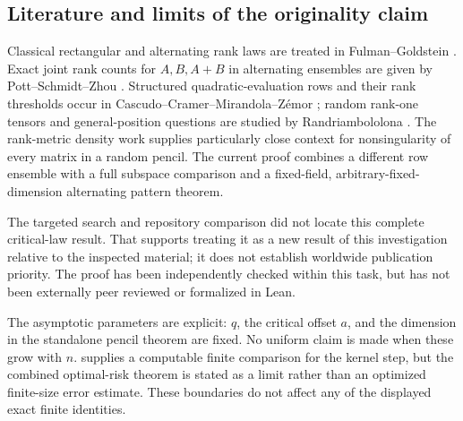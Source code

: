 \subsection{Literature and limits of the originality claim}

Classical rectangular and alternating rank laws are treated in
Fulman--Goldstein \cite{fulman}. Exact joint rank counts for
$A,B,A+B$ in alternating ensembles are given by Pott--Schmidt--Zhou
\cite{pott}. Structured quadratic-evaluation rows and their rank
thresholds occur in Cascudo--Cramer--Mirandola--Z\'emor \cite{cascudo};
random rank-one tensors and general-position questions are studied by
Randriambololona \cite{randriam}. The rank-metric density work
\cite{gruica} supplies particularly close context for nonsingularity of
every matrix in a random pencil. The current proof combines a different
row ensemble with a full subspace comparison and a fixed-field,
arbitrary-fixed-dimension alternating pattern theorem.

The targeted search and repository comparison did not locate this complete
critical-law result. That supports treating it as a new result of this
investigation relative to the inspected material; it does not establish
worldwide publication priority. The proof has been independently checked
within this task, but has not been externally peer reviewed or formalized
in Lean.

The asymptotic parameters are explicit: $q$, the critical offset $a$, and
the dimension in the standalone pencil theorem are fixed. No uniform
claim is made when these grow with $n$.  supplies a
computable finite comparison for the kernel step, but the combined
optimal-risk theorem is stated as a limit rather than an optimized
finite-size error estimate. These boundaries do not affect any of the
displayed exact finite identities.
